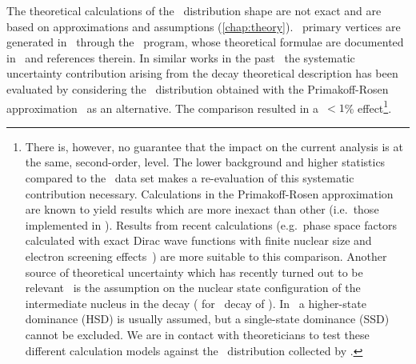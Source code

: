 \begin{description}[wide]
  \item[Theoretical \nnbb\ decay model] The theoretical calculations of the \nnbb\
    distribution shape are not exact and are based on approximations and assumptions
    (\cref{chap:theory}).  \nnbb\ primary vertices are generated in \mage\ through the
    \decayzero\ program, whose theoretical formulae are documented
    in~\cite{Ponkratenko2000} and references therein. In similar works in the
    past~\cite{Agostini2015a, Agostini2013c} the systematic uncertainty contribution
    arising from the decay theoretical description has been evaluated by considering the
    \nnbb\ distribution obtained with the Primakoff-Rosen
    approximation~\cite{Primakoff1959} as an alternative. The comparison resulted in
    a~$<1$\% effect\footnote{%
      There is, however, no guarantee that the impact on the current analysis is at the
      same, second-order, level. The lower background and higher statistics compared to
      the \phaseone\ data set makes a re-evaluation of this systematic contribution
      necessary. Calculations in the Primakoff-Rosen approximation are known to yield
      results which are more inexact than other (i.e.~those implemented in \decayzero).
      Results from recent calculations (e.g.~phase space factors calculated with exact
      Dirac wave functions with finite nuclear size and electron screening
      effects~\cite{Kotila2012}) are more suitable to this comparison.
      Another source of theoretical uncertainty which has recently turned out to be
      relevant~\cite{Arnold2019, Azzolini2019a} is the assumption on the nuclear state
      configuration of the intermediate nucleus in the decay (\nuc{As}{76} for \nnbb\
      decay of \gesix). In \gesix\ a higher-state dominance (HSD) is usually assumed, but
      a single-state dominance (SSD) cannot be excluded. We are in contact with
      theoreticians to test these different calculation models against the \nnbb\
      distribution collected by \gerda.
    }.


\end{description}
